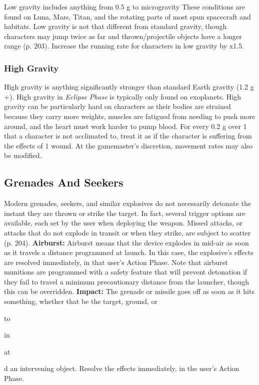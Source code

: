 Low gravity includes anything from 0.5 g to microgravity
These conditions are found on Luna, Mars,
Titan, and the rotating parts of most spun spacecraft 
and habitats. Low gravity is not that different from 
standard gravity, though characters may jump twice as 
far and thrown/projectile objects have a longer range 
(p. 203). Increase the running rate for characters in 
low gravity by x1.5.

\subsubsection{High Gravity}

High gravity is anything significantly stronger than 
standard Earth gravity (1.2 g +). High gravity in 
\textit{Eclipse Phase} is typically only found on exoplanets. 
High gravity can be particularly hard on characters 
as their bodies are strained because they carry more 
weights, muscles are fatigued from needing to push 
more around, and the heart must work harder to 
pump blood. For every 0.2 g over 1 that a character is 
not acclimated to, treat it as if the character is suffering
from the effects of 1 wound. At the gamemaster's
discretion, movement rates may also be modified.

\subsection{Grenades And Seekers}

Modern grenades, seekers, and similar explosives do 
not necessarily detonate the instant they are thrown 
or strike the target. In fact, several trigger options 
are available, each set by the user when deploying 
the weapon. Missed attacks, or attacks that do not 
explode in transit or when they strike, are subject to 
scatter (p. 204).
\textbf{Airburst:} Airburst means that the device explodes in 
mid-air as soon as it travels a distance programmed at 
launch. In this case, the explosive's effects are resolved 
immediately, in that user's Action Phase. Note that 
airburst munitions are programmed with a safety feature
that will prevent detonation if they fail to travel
a minimum precautionary distance from the launcher, 
though this can be overridden.
\textbf{Impact:} The grenade or missile goes off as soon as it 
hits something, whether that be the target, ground, or 

to

in

at

d
an intervening object. Resolve the effects immediately, 
in the user's Action Phase.

